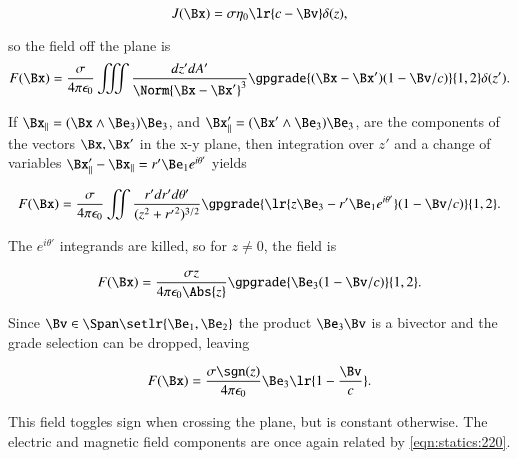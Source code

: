 \begin{dmath}\label{eqn:statics:240}
J(\Bx) = \sigma \eta_0 \lr{ c - \Bv } \delta(z),
\end{dmath}

so the field off the plane is
\begin{dmath}\label{eqn:statics:260}
F(\Bx)
=
\frac{\sigma}{4 \pi \epsilon_0 } \iiint \frac{dz' dA'}{ \Norm{ \Bx - \Bx' }^3 }
\gpgrade{ (\Bx - \Bx') (1 - \Bv/c) }{1,2} \delta(z').
\end{dmath}

If \( \Bx_\parallel = (\Bx \wedge \Be_3) \Be_3 \), and \( \Bx'_\parallel = (\Bx' \wedge \Be_3) \Be_3 \), are the components of the vectors \( \Bx, \Bx' \) in the x-y plane, then integration over \( z' \) and a change of variables \( \Bx'_\parallel - \Bx_\parallel = r' \Be_1 e^{i \theta'} \) yields

\begin{dmath}\label{eqn:statics:280}
F(\Bx)
=
\frac{\sigma}{4 \pi \epsilon_0 } \iint \frac{r' dr' d\theta'}{ ( z^2 + {r'}^2 )^{3/2} }
\gpgrade{ \lr{ z \Be_3 - r' \Be_1 e^{i\theta'} } (1 - \Bv/c) }{1,2}.
\end{dmath}

The \( e^{i\theta'} \) integrands are killed, so for \( z \ne 0 \), the field is

\begin{dmath}\label{eqn:statics:300}
F(\Bx)
=
\frac{\sigma z}{4 \pi \epsilon_0 \Abs{z} } \gpgrade{ \Be_3 (1 - \Bv/c) }{1,2}.
\end{dmath}

Since \( \Bv \in \Span \setlr{ \Be_1, \Be_2 } \) the product \( \Be_3 \Bv \) is a bivector and the grade selection can be dropped, leaving

\begin{dmath}\label{eqn:statics:320}
F(\Bx)
=
\frac{\sigma \sgn(z)}{4 \pi \epsilon_0 } \Be_3 \lr{ 1 - \frac{\Bv}{c}}.
\end{dmath}

This field toggles sign when crossing the plane, but is constant otherwise.  The electric and magnetic field components are once again related by \cref{eqn:statics:220}.


